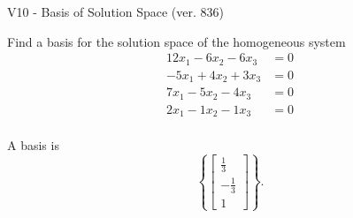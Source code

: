 \begin{exercise}
  \begin{exerciseTitle}V10 - Basis of Solution Space (ver. 836)\end{exerciseTitle}
  \begin{exerciseStatement}
    Find a basis for the solution space of the homogeneous system 
\begin{align*}
 12 x_ 1 -6 x_ 2 -6 x_ 3 &= 0  \\ 
  -5 x_ 1 + 4 x_ 2 + 3 x_ 3 &= 0  \\ 
  7 x_ 1 -5 x_ 2 -4 x_ 3 &= 0  \\ 
  2 x_ 1 -1 x_ 2 -1 x_ 3 &= 0  \\ 
 \end{align*}


 
  \end{exerciseStatement}

  \begin{exerciseAnswer}
   A basis is   
\[\left\{\left[\begin{array}{c}
\frac{1}{3} \\
-\frac{1}{3} \\
1
\end{array}\right]\right\}.\]

  


  \end{exerciseAnswer}
\end{exercise}